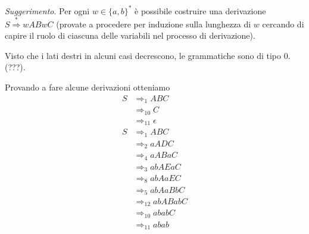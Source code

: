 \documentclass[12pt, answers]{exam}
\begin{document}
\begin{questions}
	\textit{Suggerimento}. Per ogni $w \in \{a, b\}^*$ è possibile costruire una derivazione $S \overset{*}{\Rightarrow} w A B w C$ (provate a procedere per induzione sulla lunghezza di $w$ cercando di capire il ruolo di ciascuna delle variabili nel processo di derivazione).
	\begin{solution}
		Visto che i lati destri in alcuni casi decrescono, le grammatiche sono di tipo 0. (???).

		Provando a fare alcune derivazioni otteniamo
		\begin{align*}
			S &\Rightarrow_1 A B C \\
			  &\Rightarrow_{10} C \\
			  &\Rightarrow_{11} \epsilon \\
			S &\Rightarrow_1 A B C \\
			  &\Rightarrow_2 a A D C \\
			  &\Rightarrow_4 a A B a C \\
			  &\Rightarrow_3 a b A E a C \\
			  &\Rightarrow_8 a b A a E C \\
			  &\Rightarrow_5 a b A a B b C \\
			  &\Rightarrow_{12} a b A B a b C \\
			  &\Rightarrow_{10} a b a b C \\
			  &\Rightarrow_{11} a b a b 
		\end{align*}


\end{solution}
\end{questions}
\end{document}
